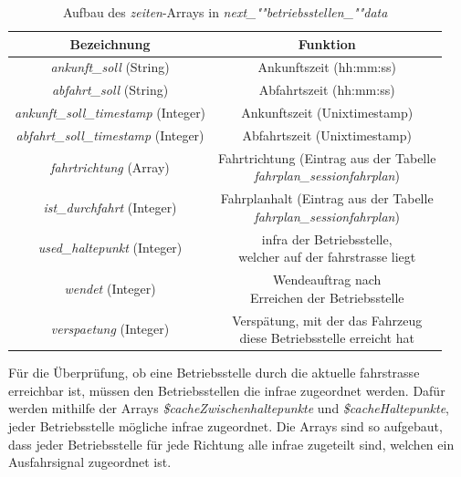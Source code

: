 \begin{table}
\begin{center}
\renewcommand{\arraystretch}{1.2}
\begin{tabular}{c|c}
Bezeichnung & Funktion \\ \hline
\textit{ankunft\_soll} (String)                  		&    Ankunftszeit (hh:mm:ss)                  \\ \hline
\textit{abfahrt\_soll} (String)                  		&     Abfahrtszeit (hh:mm:ss)                 \\ \hline
\textit{ankunft\_soll\_timestamp} (Integer)             	&   Ankunftszeit (Unixtimestamp)              \\ \hline
\textit{abfahrt\_soll\_timestamp} (Integer)             	&    Abfahrtszeit (Unixtimestamp)             \\ \hline
\textit{fahrtrichtung} (Array)                  		&   \makecell{Fahrtrichtung (Eintrag aus der Tabelle\\\textit{fahrplan\_sessionfahrplan})}                  \\ \hline
\textit{ist\_durchfahrt} (Integer)             	&    \makecell{Fahrplanhalt (Eintrag aus der Tabelle\\\textit{fahrplan\_sessionfahrplan})}               \\ \hline
\textit{used\_haltepunkt} (Integer)             	&    \makecell{\ac{infra} der Betriebsstelle,\\welcher auf der \Gls{fahrstrasse} liegt}             \\ \hline
\textit{wendet} (Integer)             	&    \makecell{Wendeauftrag nach\\Erreichen der Betriebsstelle}                \\ \hline
\textit{verspaetung} (Integer)             	&    \makecell{Verspätung, mit der das Fahrzeug\\diese Betriebsstelle erreicht hat}               \\ 
\end{tabular}
\renewcommand{\arraystretch}{1}
\caption{Aufbau des \textit{zeiten}-Arrays in \textit{next\_""betriebs\-stellen\_""data}}
\label{table:betriebsstellenzeiten}
\end{center}
\end{table}
Für die Überprüfung, ob eine Betriebsstelle durch die aktuelle \Gls{fahrstrasse} erreichbar ist, müssen den Betriebsstellen die \ac{infra}e zugeordnet werden. Dafür werden mithilfe der Arrays \textit{\$cache\-Zwischen\-halte\-punkte} und \textit{\$cache\-Halte\-punkte}, jeder Betriebsstelle mögliche \ac{infra}e zugeordnet. Die Arrays sind so aufgebaut, dass jeder Betriebsstelle für jede Richtung alle \ac{infra}e zugeteilt sind, welchen ein Ausfahrsignal zugeordnet ist.

